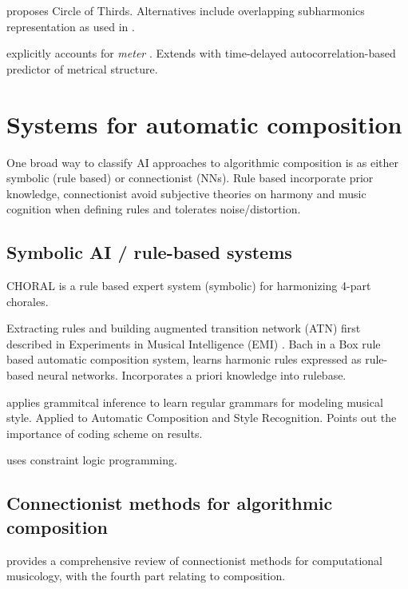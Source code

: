 \documentclass[dissertation.tex]{subfiles}
\begin{document}
\cite{franklin2004recurrent} proposes Circle of Thirds. Alternatives
include overlapping subharmonics representation\cite{laden1989representation}
as used in \cite{mozer1994neural}.

\cite{eck2008learning} explicitly accounts for \emph{meter} . Extends \cite{Eck2002} with time-delayed
autocorrelation-based predictor of metrical structure.


\section{Systems for automatic composition}

One broad way to classify AI approaches to algorithmic composition is as either
symbolic (rule based) or connectionist (NNs)\cite{toiviainen2000symbolic}.
Rule based incorporate prior knowledge, connectionist avoid subjective theories
on harmony and music cognition when defining rules and tolerates noise/distortion.

\subsection{Symbolic AI / rule-based systems}

CHORAL \cite{ebciouglu1988expert} is a rule based expert system (symbolic) for
harmonizing 4-part chorales.

Extracting rules and building augmented transition network (ATN) first
described in Experiments in Musical Intelligence (EMI) \cite{cope1992computer}.
Bach in a Box \cite{spangler1998bach} rule based automatic composition system,
learns harmonic rules expressed as rule-based neural networks. Incorporates a
priori knowledge into rulebase.

\cite{cruz1998learning} applies grammitcal inference to learn regular grammars
for modeling musical style. Applied to Automatic Composition and Style
Recognition. Points out the importance of coding scheme on results.

\cite{tsang1991harmonizing} uses constraint logic programming.

\subsection{Connectionist methods for algorithmic composition}

\cite{griffith1999musical} provides a comprehensive review of connectionist
methods for computational musicology, with the fourth part relating to
composition.
\end{document}
